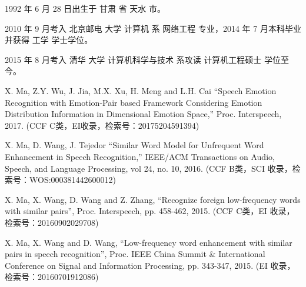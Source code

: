 \begin{resume}


  1992 年 6 月 28 日出生于 甘肃 省 天水 市。

  2010 年 9 月考入 北京邮电 大学 计算机 系 网络工程 专业，2014 年 7 月本科毕业并获得 工学 学士学位。

  2015 年 8 月考入 清华 大学 计算机科学与技术 系攻读 计算机工程硕士 学位至今。


  \begin{publications}
    \item X. Ma, Z.Y. Wu, J. Jia, M.X. Xu, H. Meng and L.H. Cai “Speech Emotion Recognition with Emotion-Pair based Framework Considering Emotion Distribution Information in Dimensional Emotion Space,” Proc. Interspeech, 2017. (CCF C类，EI收录，检索号：20175204591394)
    \item X. Ma, D. Wang, J. Tejedor “Similar Word Model for Unfrequent Word Enhancement in Speech Recognition,” IEEE/ACM Transactions on Audio, Speech, and Language Processing, vol 24, no. 10, 2016. (CCF B类，SCI 收录，检索号：WOS:000381442600012)
    \item X. Ma, X. Wang, D. Wang and Z. Zhang, “Recognize foreign low-frequency words with similar pairs”, Proc. Interspeech, pp. 458-462, 2015. (CCF C类，EI 收录，检索号：20160902029708)
    \item X. Ma, X. Wang and D. Wang, “Low-frequency word enhancement with similar pairs in speech recognition”, Proc. IEEE China Summit \& International Conference on Signal and Information Processing, pp. 343-347, 2015. (EI 收录，检索号：20160701912086)
  \end{publications}




\end{resume}
